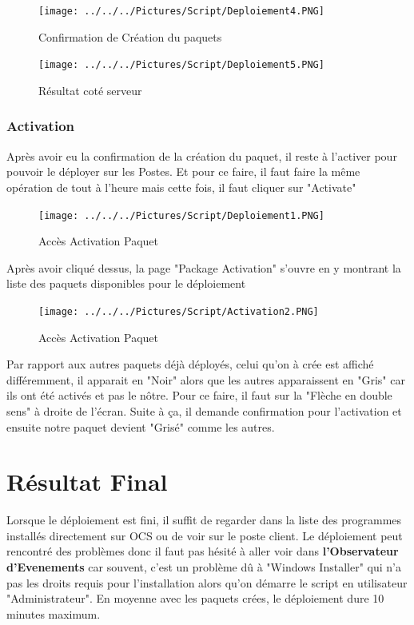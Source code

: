 \documentclass[11pt,a4paper,oneside]{article}
\begin{document}
\begin{figure}[hbtp]
\centering
\texttt{[image: ../../../Pictures/Script/Deploiement4.PNG]}
\caption{Confirmation de Création du paquets}
\end{figure}

\begin{figure}[hbtp]
\centering
\texttt{[image: ../../../Pictures/Script/Deploiement5.PNG]}
\caption{Résultat coté serveur}
\end{figure}
\newpage
\subsubsection{Activation}

Après avoir eu la confirmation de la création du paquet, il reste à l'activer pour pouvoir le déployer sur les Postes. Et pour ce faire, il faut faire la même opération de tout à l'heure mais cette fois, il faut cliquer sur "Activate"

\begin{figure}[hbtp]
\centering
\texttt{[image: ../../../Pictures/Script/Deploiement1.PNG]}
\caption{Accès Activation Paquet}
\end{figure}

Après avoir cliqué dessus, la page "Package Activation" s'ouvre en y montrant la liste des paquets disponibles pour le déploiement

\begin{figure}[hbtp]
\centering
\texttt{[image: ../../../Pictures/Script/Activation2.PNG]}
\caption{Accès Activation Paquet}
\end{figure}
 
Par rapport aux autres paquets déjà déployés, celui qu'on à crée est affiché différemment, il apparait en "Noir" alors que les autres apparaissent en "Gris" car ils ont été activés et pas le nôtre. Pour ce faire, il faut sur la "Flèche en double sens" à droite de l'écran. Suite à ça, il demande confirmation pour l'activation et ensuite notre paquet devient "Grisé" comme les autres.
\newpage

\section{Résultat Final}
Lorsque le déploiement est fini, il suffit de regarder dans la liste des programmes installés directement sur OCS ou de voir sur le poste client. Le déploiement peut rencontré des problèmes donc il faut pas hésité à aller voir dans \textbf{l'Observateur d'Evenements} car souvent, c'est un problème dû à "Windows Installer" qui n'a pas les droits requis pour l'installation alors qu'on démarre le script en utilisateur "Administrateur". En moyenne avec les paquets crées, le déploiement dure 10  minutes maximum. 
\end{document}
